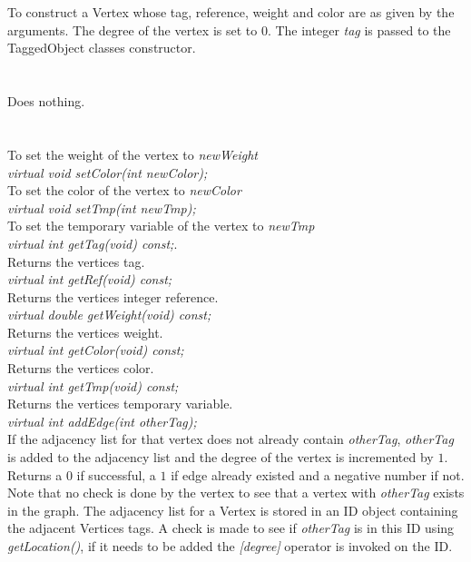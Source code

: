   \\
  \\
To construct a Vertex whose tag, reference, weight and color are as
given by the arguments. The degree of the vertex is set to $0$. The
integer {\em tag} is passed to the TaggedObject classes constructor.\\

  \\
  \\
Does nothing. \\

  \\
 \\
To set the weight of the vertex to {\em newWeight} \\    

{\em virtual void setColor(int newColor);} \\
To set the color of the vertex to {\em newColor} \\    

{\em virtual void setTmp(int newTmp);} \\
To set the temporary variable of the vertex to {\em newTmp} \\    

{\em virtual int getTag(void) const;}. \\
Returns the vertices tag.\\

{\em virtual int getRef(void) const; } \\
Returns the vertices integer reference.\\

{\em virtual double getWeight(void) const;} \\
Returns the vertices weight. \\

{\em virtual int getColor(void) const; } \\
Returns the vertices color. \\

{\em virtual int getTmp(void) const; } \\
Returns the vertices temporary variable. \\

{\em virtual int addEdge(int otherTag); } \\
If the adjacency list for that vertex does not already contain {\em
otherTag}, {\em otherTag} is added to the adjacency list and the
degree of the vertex is incremented by $1$. Returns a $0$ if
successful, a $1$ if edge already existed and a negative number if
not. Note that no check is done by the vertex to see that a vertex
with {\em otherTag} exists in the graph. The adjacency list for a
Vertex is stored in an ID object containing the adjacent Vertices
tags. A check is made to see if {\em otherTag} is in this ID using
{\em getLocation()}, if it needs to be added the {\em [degree]}
operator is invoked on the ID. \\ 

